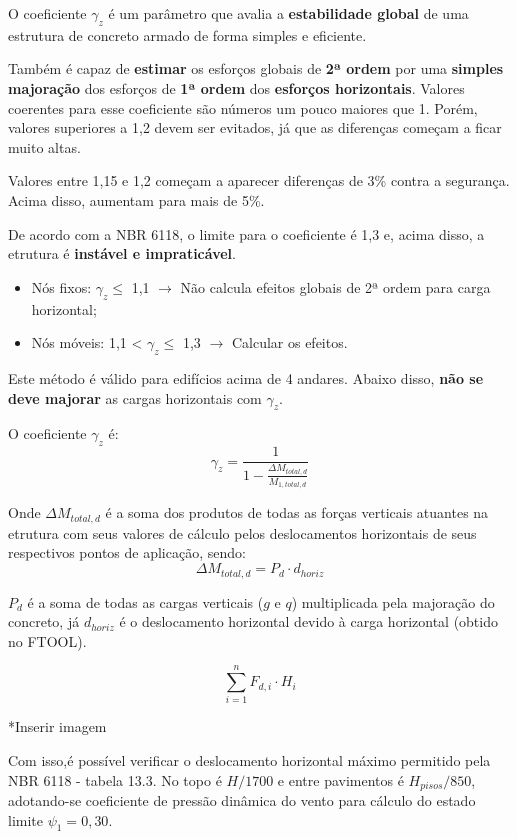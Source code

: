 O coeficiente $\gamma_z$ é um parâmetro que avalia a \textbf{estabilidade global} de uma estrutura de concreto armado de forma simples e eficiente.

Também é capaz de \textbf{estimar} os esforços globais de \textbf{2ª ordem} por uma \textbf{simples majoração} dos esforços de \textbf{1ª ordem} dos \textbf{esforços horizontais}. Valores coerentes para esse coeficiente são números um pouco maiores que 1. Porém, valores superiores a 1,2 devem ser evitados, já que as diferenças começam a ficar muito altas.

Valores entre 1,15 e 1,2 começam a aparecer diferenças de 3\% contra a segurança. Acima disso, aumentam para mais de 5\%.

De acordo com a NBR 6118, o limite para o coeficiente é 1,3 e, acima disso, a etrutura é \textbf{instável e impraticável}.

\begin{itemize}
	\item Nós fixos: $\gamma_z\leqslant$ 1,1 $\rightarrow$ Não calcula efeitos globais de 2ª ordem para carga horizontal;
	\item Nós móveis: 1,1 < $\gamma_z\leqslant$ 1,3 $\rightarrow$ Calcular os efeitos. 
\end{itemize}

Este método é válido para edifícios acima de 4 andares. Abaixo disso, \textbf{não se deve majorar} as cargas horizontais com $\gamma_z$.

O coeficiente $\gamma_z$ é: $$\gamma_z=\frac{1}{1-\frac{\Delta M_{total, d}}{M_{1, total, d}}}$$

Onde $\Delta M_{total, d}$ é a soma dos produtos de todas as forças verticais atuantes na etrutura com seus valores de cálculo pelos deslocamentos horizontais de seus respectivos pontos de aplicação, sendo: $$\Delta M_{total, d}=P_d\cdot d_{horiz}$$

$P_d$ é a soma de todas as cargas verticais ($g$ e $q$) multiplicada pela majoração do concreto, já $d_{horiz}$ é o deslocamento horizontal devido à carga horizontal (obtido no FTOOL).

$$\sum_{i=1}^{n} F_{d, i}\cdot H_i$$

*Inserir imagem

Com isso,é possível verificar o deslocamento horizontal máximo permitido pela NBR 6118 - tabela 13.3. No topo é $H/1700$ e entre pavimentos é $H_{pisos}/850$, adotando-se coeficiente de pressão dinâmica do vento para cálculo do estado limite $\psi_1=0,30$.